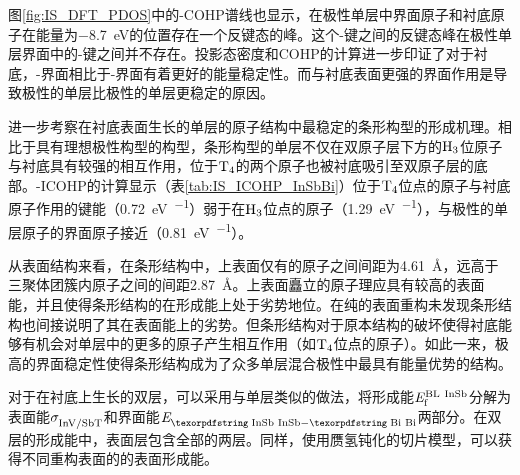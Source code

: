图\ref{fig:IS_DFT_PDOS}中的-COHP谱线也显示，在极性单层中界面原子和衬底原子在能量为\SI{-8.7}{\electronvolt}的位置存在一个反键态的峰。这个-键之间的反键态峰在极性单层界面中的-键之间并不存在。投影态密度和COHP的计算进一步印证了对于衬底，-界面相比于-界面有着更好的能量稳定性。而与衬底表面更强的界面作用是导致极性的单层比极性的单层更稳定的原因。

进一步考察在衬底表面生长的单层的原子结构中最稳定的条形构型的形成机理。相比于具有理想极性构型的构型，条形构型的单层不仅在双原子层下方的$\rm H_{3} \it$位原子与衬底具有较强的相互作用，位于$\rm T_{4} \it$的两个原子也被衬底吸引至双原子层的底部。-ICOHP的计算显示（表\ref{tab:IS_ICOHP_InSbBi}）位于$\rm T_{4} \it$位点的原子与衬底原子作用的键能（\SI{0.72}{\electronvolt\per\pair}）弱于在$\rm H_{3} \it$位点的原子（\SI{1.29}{\electronvolt\per\pair}），与极性的单层原子的界面原子接近（\SI{0.81}{\electronvolt\per\pair}）。



从表面结构来看，在条形结构中，上表面仅有的原子之间间距为\SI{4.61}{\angstrom}，远高于三聚体团簇内原子之间的间距\SI{2.87}{\angstrom}。上表面矗立的原子理应具有较高的表面能，并且使得条形结构的在形成能上处于劣势地位。在纯的表面重构未发现条形结构也间接说明了其在表面能上的劣势。但条形结构对于原本结构的破坏使得衬底能够有机会对单层中的更多的原子产生相互作用（如$\rm T_{4} \it$位点的原子）。如此一来，极高的界面稳定性使得条形结构成为了众多单层混合极性中最具有能量优势的结构。

对于在衬底上生长的双层，可以采用与单层类似的做法，将形成能$\it E_{\rm f}^{\rm BL\ InSb} \it$分解为表面能$\it \sigma_{\rm InV/ SbT}^{\rm } \it$和界面能$\energyVar{\cemb{InSb}-\cemb{Bi}}{}$两部分。在双层的形成能中，表面层包含全部的两层。同样，使用赝氢钝化的切片模型，可以获得不同重构表面的的表面形成能。

